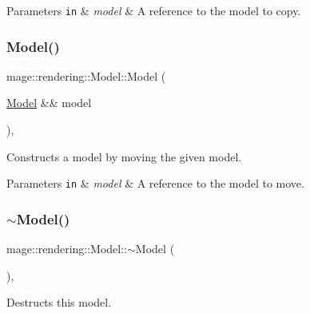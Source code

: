 \begin{DoxyParams}[1]{Parameters}
\mbox{\tt in}  & {\em model} & A reference to the model to copy. \\
\hline
\end{DoxyParams}
\hypertarget{classmage_1_1rendering_1_1_model_a550ece2d159145d9e9549e48235d1ca1}{}\label{classmage_1_1rendering_1_1_model_a550ece2d159145d9e9549e48235d1ca1} 
\subsubsection{\texorpdfstring{Model()}{Model()}\hspace{0.1cm}{\footnotesize\ttfamily [3/3]}}
{\footnotesize\ttfamily mage\+::rendering\+::\+Model\+::\+Model (\begin{DoxyParamCaption}\item[{\hyperlink{classmage_1_1rendering_1_1_model}{Model} \&\&}]{model }\end{DoxyParamCaption})\hspace{0.3cm}{\ttfamily [default]}, {\ttfamily [noexcept]}}

Constructs a model by moving the given model.


\begin{DoxyParams}[1]{Parameters}
\mbox{\tt in}  & {\em model} & A reference to the model to move. \\
\hline
\end{DoxyParams}
\hypertarget{classmage_1_1rendering_1_1_model_a8fd12c516788a98ce5109aee41d834b8}{}\label{classmage_1_1rendering_1_1_model_a8fd12c516788a98ce5109aee41d834b8} 
\subsubsection{\texorpdfstring{$\sim$\+Model()}{~Model()}}
{\footnotesize\ttfamily mage\+::rendering\+::\+Model\+::$\sim$\+Model (\begin{DoxyParamCaption}{ }\end{DoxyParamCaption})\hspace{0.3cm}{\ttfamily [virtual]}, {\ttfamily [default]}}

Destructs this model. 

